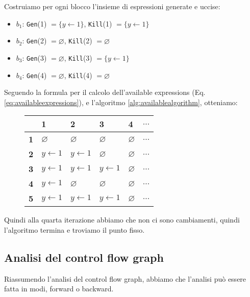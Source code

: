     Costruiamo per ogni blocco l'insieme di espressioni generate e uccise:
    \begin{itemize}
        \item $b_1$: \texttt{Gen}(1) $= \{y \gets 1\}$, \texttt{Kill}(1) $= \{ y \gets 1 \}$
        \item $b_2$: \texttt{Gen}(2) $= \varnothing$, \texttt{Kill}(2) $= \varnothing$
        \item $b_3$: \texttt{Gen}(3) $= \varnothing$, \texttt{Kill}(3) $= \{ y \gets 1 \}$
        \item $b_4$: \texttt{Gen}(4) $= \varnothing$, \texttt{Kill}(4) $= \varnothing$
    \end{itemize}

    Seguendo la formula per il calcolo dell'available expressions (Eq. \ref{eq:availableexpressions}), e l'algoritmo 
    \ref{alg:availablealgorithm}, otteniamo:
    \begin{figure}[H]
        \centering
        \renewcommand{\arraystretch}{2}
        \begin{tabular}{|>{\centering\arraybackslash}m{5em}|m{5em}|m{5em}|m{5em}|m{5em}|m{5em}|}
            \hline
            & \textbf{1} & \textbf{2} & \textbf{3} & \textbf{4} & \textbf{$\dots$} \\
            \hline
            \textbf{1} & $\varnothing$ & $\varnothing$ & $\varnothing$ & $\varnothing$ & $\dots$ \\
            \hline
            \textbf{2} & $y \gets 1$ & $y \gets 1$ & $\varnothing$ 
            & $\varnothing$ & $\dots$ \\
            \hline
            \textbf{3} & $y \gets 1$ &$y \gets 1$ & $y \gets 1$ & $\varnothing$ & $\dots$ \\
            \hline
            \textbf{4} & $y \gets 1$ & $\varnothing$ & $\varnothing$  & $\varnothing$ & $\dots$ \\
            \hline
            \textbf{5} & $y \gets 1$  & $y \gets 1$ & $y \gets 1$ & $\varnothing$ & $\dots$ \\
            \hline
        \end{tabular}
    \end{figure}
Quindi alla quarta iterazione abbiamo che non ci sono cambiamenti, quindi l'algoritmo termina e troviamo il punto fisso.
\subsection{Analisi del control flow graph}
Riassumendo l'analisi del control flow graph, abbiamo che l'analisi può essere fatta in modi, forward o backward.

